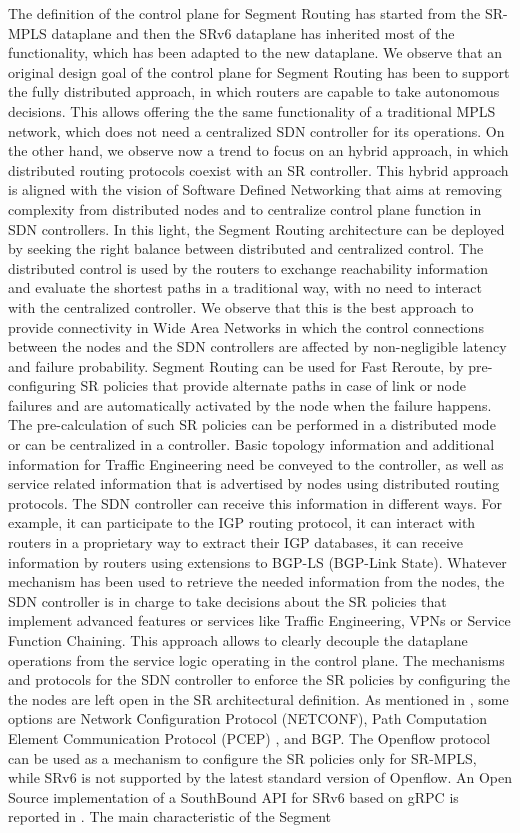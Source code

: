 The definition of the control plane for Segment Routing has started from the SR-MPLS dataplane and then the SRv6 dataplane has inherited most of the functionality, which has been adapted to the new dataplane. We observe that an original design goal of the control plane for Segment Routing has been to support the fully distributed approach, in which routers are capable to take autonomous decisions. This allows offering the the same functionality of a traditional MPLS network, which does not need a centralized SDN controller for its operations. On the other hand, we observe now a trend to focus on an hybrid approach, in which distributed routing protocols coexist with an SR controller. This hybrid approach is aligned with the vision of Software Defined Networking that aims at removing complexity from distributed nodes and to centralize control plane function in SDN controllers. In this light, the Segment Routing architecture can be deployed by seeking the right balance between distributed and centralized control. The distributed control is used by the routers to exchange reachability information and evaluate the shortest paths in a traditional way, with no need to interact with the centralized controller. We observe that this is the best approach to provide connectivity in Wide Area Networks in which the control connections between the nodes and the SDN controllers are affected by non-negligible latency and failure probability. Segment Routing can be used for Fast Reroute, by pre-configuring SR policies that provide alternate paths in case of link or node failures and are automatically activated by the node when the failure happens. The pre-calculation of such SR policies can be performed in a distributed mode or can be centralized in a controller. Basic topology information and additional information for Traffic Engineering need be conveyed to the controller, as well as service related information that is advertised by nodes using distributed routing protocols. The SDN controller can receive this information in different ways. For example, it can participate to the IGP routing protocol, it can interact with routers in a proprietary way to extract their IGP databases, it can receive information by routers using extensions to BGP-LS (BGP-Link State). Whatever mechanism has been used to retrieve the needed information from the nodes, the SDN controller is in charge to take decisions about the SR policies that implement advanced features or services like Traffic Engineering, VPNs or Service Function Chaining. This approach allows to clearly decouple the dataplane operations from the service logic operating in the control plane. The mechanisms and protocols for the SDN controller to enforce the SR policies by configuring the the nodes are left open in the SR architectural definition. As mentioned in \cite{rfc8402}, some options are Network Configuration Protocol (NETCONF), Path Computation Element Communication Protocol (PCEP) \cite{ietf-pce-segment-routing}, and BGP. The Openflow protocol can be used as a mechanism to configure the SR policies only for SR-MPLS, while SRv6 is not supported by the latest standard version of Openflow. An Open Source implementation of a SouthBound API for SRv6 based on gRPC is reported in \cite{ventre2018sdn}. The main characteristic of the Segment 